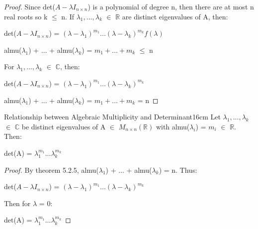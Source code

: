     \begin{proof}
        Since det($A - \lambda I_{n \times n}$) is a polynomial
        of degree n, then there are at most n real roots so k $\leq$ n.
        If $\lambda_1,...,\lambda_k$ $\in$ $\mathbb{R}$
        are distinct eigenvalues of A, then:

        \hspace{0.5cm}
        det($A - \lambda I_{n \times n}$)
        = $(\lambda - \lambda_1)^{m_1} ... (\lambda - \lambda_k)^{m_k} f(\lambda)$

        \hspace{0.5cm}
        almu($\lambda_1$) + ... + almu($\lambda_k$)
        = $m_1 + ... + m_k$
        $\leq$ n

        For $\lambda_1,...,\lambda_k$ $\in$ $\mathbb{C}$, then:

        \hspace{0.5cm}
        det($A - \lambda I_{n \times n}$)
        = $(\lambda - \lambda_1)^{m_1} ... (\lambda - \lambda_k)^{m_k}$

        \hspace{0.5cm}
        almu($\lambda_1$) + ... + almu($\lambda_k$)
        = $m_1 + ... + m_k$
        = n
    \end{proof}

    \newpage



    \begin{corollary}{Relationship between Algebraic Multiplicity
    and Determinant}{16cm}
        Let $\lambda_1,...,\lambda_k$ $\in$ $\mathbb{C}$ be distinct eigenvalues
        of A $\in$ $M_{n \times n}(\mathbb{R})$ with
        almu($\lambda_i$) = $m_i$ $\in$ $\mathbb{R}$.
        Then:

        \hspace{0.5cm}
        det(A) = $\lambda_1^{m_1}...\lambda_k^{m_k}$
    \end{corollary}

    \begin{proof}
        By {\color{red} theorem 5.2.5},
        almu($\lambda_1$) + ... + almu($\lambda_k$) = n. Thus:

        \hspace{0.5cm}
        det($A - \lambda I_{n \times n}$)
        = $(\lambda - \lambda_1)^{m_1} ... (\lambda - \lambda_k)^{m_k}$

        Then for $\lambda$ = 0:

        \hspace{0.5cm}
        det(A) = $\lambda_1^{m_1}...\lambda_k^{m_k}$
    \end{proof}

